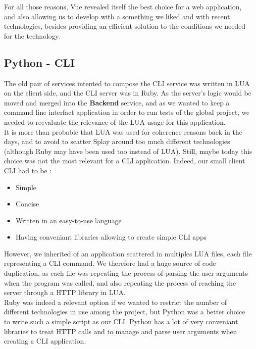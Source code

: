 \documentclass{eplmastersthesis}
\begin{document}
        For all those reasons, Vue revealed itself the best choice for a
        web application, and also allowing us to develop with a something
        we liked and with recent technologies, besides providing an efficient
        solution to the conditions we needed for the technology.

      \subsection{Python - CLI}

        The old pair of services intented to compose the CLI service was
        written in LUA on the client side, and the CLI server was in Ruby. As
        the server's logic would be moved and merged into the \textbf{Backend}
        service, and as we wanted to keep a command line interfact application
        in order to run tests of the global project, we needed to reevaluate
        the relevance of the LUA usage for this application.\\

        It is more than probable that LUA was used for coherence reasons back
        in the days, and to avoid to scatter Splay around too much different
        technologies (although Ruby may have been used too instead of LUA).
        Still, maybe today this choice was not the most relevant for a CLI
        application. Indeed, our small client CLI had to be :

        \begin{itemize}
          \item Simple
          \item Concise
          \item Written in an easy-to-use language
          \item Having conveniant libraries allowing to create simple CLI apps
        \end{itemize}

        However, we inherited of an application scattered in multiples LUA
        files, each file representing a CLI command. We therefore had a huge
        source of code duplication, as each file was repeating the process
        of parsing the user arguments when the program was called, and also
        repeating the process of reaching the server through a HTTP library
        in LUA.\\
        Ruby was indeed a relevant option if we wanted to restrict the number
        of different technologies in use among the project, but Python was
        a better choice to write such a simple script as our CLI. Python has
        a lot of very conveniant libraries to treat HTTP calls and to
        manage and parse user arguments when creating a CLI application.
\end{document}
